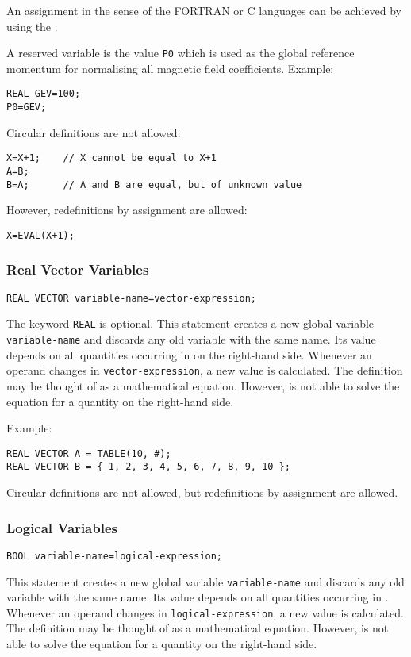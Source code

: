 An assignment in the sense of the FORTRAN or C languages can be achieved
by using the .

A reserved variable is the value \texttt{P0} which is used as the
global reference momentum for normalising all magnetic field coefficients.
\noindent Example:
\begin{verbatim}
REAL GEV=100;
P0=GEV;
\end{verbatim}
Circular definitions are not allowed:
\begin{verbatim}
X=X+1;    // X cannot be equal to X+1
A=B;
B=A;      // A and B are equal, but of unknown value
\end{verbatim}
However, redefinitions by assignment are allowed:
\begin{verbatim}
X=EVAL(X+1);
\end{verbatim}

\subsubsection{Real Vector Variables}
\begin{verbatim}
REAL VECTOR variable-name=vector-expression;
\end{verbatim}
The keyword \texttt{REAL} is optional.
This statement creates a new global variable \texttt{variable-name}
and discards any old variable with the same name.
Its value depends on all quantities occurring
in  on the right-hand side.
Whenever an operand changes in \texttt{vector-expression},
a new value is calculated.
The definition may be thought of as a mathematical equation.
However, \opal is not able to solve the equation for a quantity on the
right-hand side.

\noindent Example:
\begin{verbatim}
REAL VECTOR A = TABLE(10, #);
REAL VECTOR B = { 1, 2, 3, 4, 5, 6, 7, 8, 9, 10 };
\end{verbatim}
Circular definitions are not allowed, but redefinitions by assignment 
are allowed.

\subsubsection{Logical Variables}
\begin{verbatim}
BOOL variable-name=logical-expression;
\end{verbatim}
This statement creates a new global variable \texttt{variable-name}
and discards any old variable with the same name.
Its value depends on all quantities occurring
in .
Whenever an operand changes in \texttt{logical-expression},
a new value is calculated.
The definition may be thought of as a mathematical equation.
However, \opal is not able to solve the equation for a quantity on the
right-hand side.

